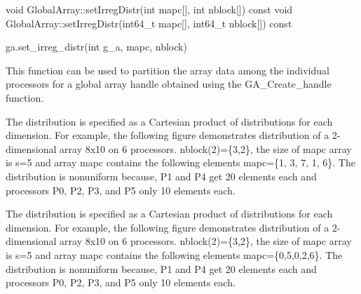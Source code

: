 \documentclass[12pt]{article}
\begin{document}
\begin{cxxapi}
\begin{cxxcode}
void GlobalArray::setIrregDistr(int mapc[], int nblock[]) const
void GlobalArray::setIrregDistr(int64_t mapc[], int64_t nblock[]) const
\end{cxxcode}
\begin{funcargs}
\end{funcargs}
\end{cxxapi}

\begin{pyapi}
\begin{pycode}
ga.set_irreg_distr(int g_a, mapc, nblock)
\end{pycode}
\begin{funcargs}
\end{funcargs}
\end{pyapi}

\gcoll

\begin{desc}

This function can be used to partition the array data among the individual
processors for a global array handle obtained using the GA_Create_handle
function.
\end{desc}

\begin{fdesc}
The distribution is specified as a Cartesian product of distributions for each
dimension. For example, the following figure demonstrates distribution of a
2-dimensional array 8x10 on 6 processors. nblock(2)=\{3,2\}, the size
of mapc array is s=5 and array mapc contains the following elements mapc=\{1,
3, 7, 1, 6\}. The distribution is nonuniform because, P1 and P4 get 20 elements
each and processors P0, P2, P3, and P5 only 10 elements each.
\end{fdesc}

\begin{cdesc}
The distribution is specified as a Cartesian product of distributions for each
dimension. For example, the following figure demonstrates distribution of a
2-dimensional array 8x10 on 6 processors. nblock(2)=\{3,2\}, the size
of mapc array is s=5 and array mapc contains the following elements
mapc=\{0,5,0,2,6\}. The distribution is nonuniform because, P1 and P4 get 20
elements each and processors P0, P2, P3, and P5 only 10 elements each.
\end{cdesc}
\end{document}
